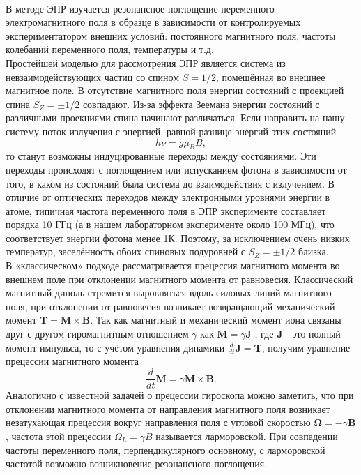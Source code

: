 \documentclass[a4paper,12pt]{article}
\begin{document}
\paragraph{}
В методе ЭПР изучается резонансное поглощение переменного электромагнитного поля в образце в зависимости от контролируемых экспериментатором внешних условий: постоянного магнитного поля, частоты колебаний переменного поля, температуры и т.д. \\
Простейшей моделью для рассмотрения ЭПР является система из невзаимодействующих
частиц со спином $S = 1/2$, помещённая во внешнее магнитное поле. В отсутствие
магнитного поля энергии состояний с проекцией спина $S_Z = \pm 1/2$ совпадают. Из-за эффекта Зеемана энергии состояний с различными проекциями спина начинают различаться. Если направить на нашу систему поток излучения с энергией, равной разнице энергий этих состояний 
\begin{equation}\label{2}
h \nu = g\mu_B B,
\end{equation} 
то станут возможны индуцированные переходы между состояниями. Эти переходы происходят с поглощением или испусканием фотона в зависимости от того, в каком из состояний была система до взаимодействия с излучением. В отличие от оптических переходов между электронными уровнями энергии в атоме, типичная частота переменного поля в ЭПР эксперименте составляет порядка 10 ГГц (а в нашем лабораторном эксперименте около 100 МГц), что соответствует энергии фотона менее 1К. Поэтому, за исключением очень низких температур, заселённость обоих спиновых подуровней с $S_Z = \pm 1/2$ близка. \\
В «классическом» подходе рассматривается прецессия магнитного момента во внешнем поле при отклонении магнитного момента от равновесия. Классический магнитный диполь стремится выровняться вдоль силовых линий магнитного поля, при отклонении от равновесия возникает возвращающий механический момент $\mathbf{T} = \mathbf{M}\times \mathbf{B}$. Так как магнитный и механический момент иона связаны друг с другом гиромагнитным отношением $\gamma$ как $\mathbf{M}=\gamma \mathbf{J}$ , где $\mathbf{J}$ - это полный момент импульса, то с учётом уравнения динамики
$\frac{d}{dt}\mathbf{J} = \mathbf{T}$, получим уравнение прецессии магнитного момента
\[\dfrac{d}{dt}\mathbf{M} = \gamma \mathbf{M} \times \mathbf{B}.\] 
Аналогично
с известной задачей о прецессии гироскопа можно заметить, что при отклонении магнитного момента от направления магнитного поля возникает незатухающая прецессия вокруг направления поля с угловой скоростью $\boldsymbol{\Omega} = -\gamma \mathbf{B}$, частота этой прецессии $\Omega_L = \gamma B$ называется ларморовской. При совпадении частоты переменного поля, перпендикулярного основному, с ларморовской частотой возможно возникновение резонансного поглощения.
\end{document}
